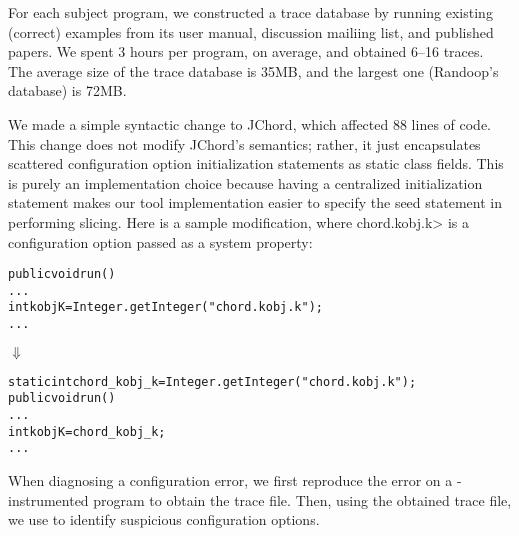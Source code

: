 For each subject program, we constructed a trace database
by running existing (correct) examples from its user manual, discussion
mailiing list, and published papers.
We spent 3 hours per program, on average, and obtained 6--16 traces.
The average size of the trace database is 35MB, and the largest one (Randoop's
database) is 72MB.



We made a simple syntactic change to JChord, which affected 88
lines of code. This change
does not modify JChord's semantics; rather, it just encapsulates
scattered configuration option initialization statements 
as static class fields. This is purely an implementation
choice because having a centralized initialization statement
makes our tool implementation easier to specify the seed statement
in performing slicing. Here is a sample modification, where 
\<chord.kobj.k> 
is a configuration option
passed as a system property:


\begin{CodeOut}
\begin{alltt}
   public void run() \ttlcb
     ...
     int kobjK = Integer.getInteger("chord.kobj.k");
     ...
   \ttrcb
\end{alltt}
\end{CodeOut}
\vspace{-4mm}
\hspace{20mm}$\Downarrow$ 
\begin{CodeOut}
\begin{alltt}
   static int chord\_kobj\_k = Integer.getInteger("chord.kobj.k");
   public void run() \ttlcb
     ...
     int kobjK = chord\_kobj\_k; 
     ...
   \ttrcb
\end{alltt}
\end{CodeOut}






When diagnosing a configuration error, we first reproduce the
error on a \ourtool-instrumented program to obtain the
trace file. Then, using the obtained trace file, we use \ourtool
to identify suspicious configuration options.

